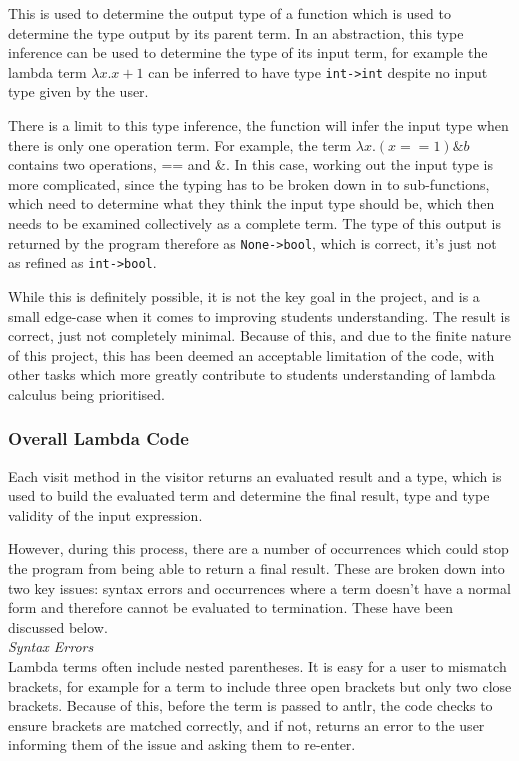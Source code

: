 \documentclass[a4paper,12pt]{report}
\begin{document}
This is used to determine the output type of a function which is used to determine the type output by its parent term. In an abstraction, this type inference can be used to determine the type of its input term, for example the lambda term $\lambda x.x+1$ can be inferred to have type \texttt{int->int} despite no input type given by the user.

There is a limit to this type inference, the function will infer the input type when there is only one operation term. For example, the term $\lambda x.(x==1)\&b$ contains two operations, == and \&. In this case, working out the input type is more complicated, since the typing has to be broken down in to sub-functions, which need to determine what they think the input type should be, which then needs to be examined collectively as a complete term. The type of this output is returned by the program therefore as \texttt{None->bool}, which is correct, it's just not as refined as \texttt{int->bool}.

While this is definitely possible, it is not the key goal in the project, and is a small edge-case when it comes to improving students understanding. The result is correct, just not completely minimal. Because of this, and due to the finite nature of this project, this has been deemed an acceptable limitation of the code, with other tasks which more greatly contribute to students understanding of lambda calculus being prioritised.

\subsubsection{Overall Lambda Code}
Each visit method in the visitor returns an evaluated result and a type, which is used to build the evaluated term and determine the final result, type and type validity of the input expression.

However, during this process, there are a number of occurrences which could stop the program from being able to return a final result. These are broken down into two key issues: syntax errors and occurrences where a term doesn't have a normal form and therefore cannot be evaluated to termination. These have been discussed below.\\

\textit{Syntax Errors}\\
Lambda terms often include nested parentheses. It is easy for a user to mismatch brackets, for example for a term to include three open brackets but only two close brackets. Because of this, before the term is passed to antlr, the code checks to ensure brackets are matched correctly, and if not, returns an error to the user informing them of the issue and asking them to re-enter.
\end{document}

